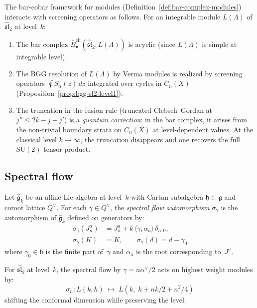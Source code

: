 \begin{remark}
\label{rem:screening-bar-module}
The bar-cobar framework for modules
(Definition~\ref{def:bar-complex-modules}) interacts with
screening operators as follows. For an integrable module
$L(\Lambda)$ of $\widehat{\mathfrak{sl}}_2$ at level~$k$:
\begin{enumerate}[label=(\roman*)]
\item The bar complex
 $\bar{B}^{\mathrm{ch}}_\bullet(\widehat{\mathfrak{sl}}_2,
 L(\Lambda))$ is acyclic (since $L(\Lambda)$ is simple at
 integrable level).
\item The BGG resolution of $L(\Lambda)$ by Verma modules
 is realized by screening operators $\oint S_\alpha(z)\,dz$
 integrated over cycles in $\overline{C}_n(X)$
 (Proposition~\ref{prop:bgg-sl2-level1}).
\item The truncation in the fusion rule (truncated Clebsch--Gordan
 at $j'' \leq 2k - j - j'$) is a \emph{quantum correction}:
 in the bar complex, it arises from the non-trivial boundary
 strata on $\overline{C}_n(X)$ at level-dependent values.
 At the classical level $k \to \infty$, the truncation disappears
 and one recovers the full $\mathrm{SU}(2)$ tensor product.
\end{enumerate}
\end{remark}

\subsection{Spectral flow}

\begin{definition}\label{def:spectral-flow}
Let $\widehat{\mathfrak{g}}_k$ be an affine Lie algebra at level~$k$
with Cartan subalgebra $\mathfrak{h} \subset \mathfrak{g}$ and coroot
lattice $Q^\vee$. For each $\gamma \in Q^\vee$, the \emph{spectral
flow automorphism} $\sigma_\gamma$ is the automorphism of
$\widehat{\mathfrak{g}}_k$ defined on generators by:
\begin{align}
\sigma_\gamma(J^a_n) &= J^a_n + k\,\langle \gamma, \alpha_a \rangle\,
\delta_{n,0}, \\
\sigma_\gamma(K) &= K, \qquad
\sigma_\gamma(d) = d - \gamma_0
\end{align}
where $\gamma_0 \in \mathfrak{h}$ is the finite part of~$\gamma$ and
$\alpha_a$ is the root corresponding to~$J^a$.

For $\widehat{\mathfrak{sl}}_2$ at level~$k$, the spectral flow by
$\gamma = n \alpha^\vee/2$ acts on highest weight modules by:
\[
\sigma_n\colon L(k, h) \;\longmapsto\; L(k,\; h + nk/2 + n^2/4)
\]
shifting the conformal dimension while preserving the level.
\end{definition}


